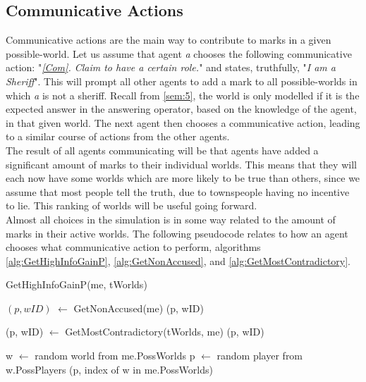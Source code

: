 \subsection{Communicative Actions}\label{CommunicativeActions}
Communicative actions are the main way to contribute to marks in a given
possible-world. Let us assume that agent \textit{a} chooses the following
communicative action: "\textit{\ref{Com}. Claim to have a certain role.}" and
states, truthfully, "\textit{I am a Sheriff}". This will prompt all other
agents to add a mark to all possible-worlds in which \textit{a} is not a
sheriff. Recall from \cref{sem:5}, the world is only modelled if it is the
expected answer in the answering operator, based on the knowledge of the agent,
in that given world. The next agent then chooses a communicative action,
leading to a similar course of actions from the other agents. \\ The result of
all agents communicating will be that agents have added a significant amount of
marks to their individual worlds. This means that they will each now have some
worlds which are more likely to be true than others, since we assume that most
people tell the truth, due to townspeople having no incentive to lie. This
ranking of worlds will be useful going forward.\\ Almost all choices in the
simulation is in some way related to the amount of marks in their active
worlds. The following pseudocode relates to how an agent chooses what
communicative action to perform, algorithms \ref{alg:GetHighInfoGainP},
\ref{alg:GetNonAccused}, and \ref{alg:GetMostContradictory}.
\begin{algorithm}[H]
	\caption{GetHighInfoGainP(me, tWorlds)}
	\begin{algorithmic}
		\State $(p, wID)$ $\gets$ GetNonAccused(me)
		\State \Return (p, wID)
		\EndIf
		\EndIf

		\State (p, wID) $\gets$ GetMostContradictory(tWorlds, me)
		\State \Return (p, wID)
		\EndIf

		\State w $\gets$ random world from me.PossWorlds
		\State p $\gets$ random player from w.PossPlayers
		\State \Return (p, index of w in me.PossWorlds)
		\label{alg:GetHighInfoGainP}
	\end{algorithmic}
\end{algorithm}
\vspace{-30px}
\setcounter{algorithmcaption}{0}
